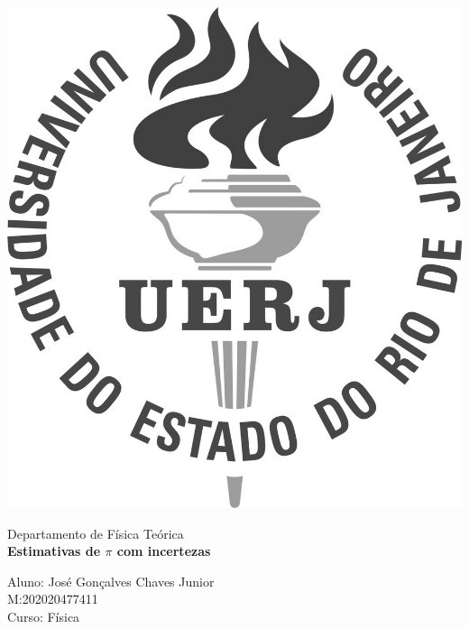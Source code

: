 \documentclass[11pt, letterpaper]{article}
\begin{document}
\begin{titlepage}
\thispagestyle{empty}
\parbox{1.5cm}{\includegraphics[scale=0.25]{logo_uerj_cinza.png}}
\Large{Departamento de Física Teórica} \\

\vspace{5cm}
\hspace{4.5cm} \Large{\textbf{Estimativas de $\pi$ com incertezas}}
\vspace{8cm}

\begin{flushright}
Aluno: José Gonçalves Chaves Junior \\
M:202020477411\\
Curso: Física 
\end{flushright}

\end{titlepage}
\tableofcontents
\end{document}
